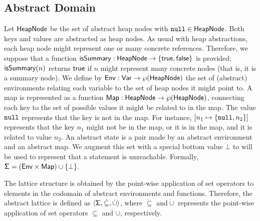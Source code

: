 \subsection{Abstract Domain}
\label{sect:abstractate}

Let $\mathsf{HeapNode}$ be the set of abstract heap nodes with $\mathtt{null} \in \mathsf{HeapNode}$. Both keys and values are abstracted as heap nodes. As usual with heap abstractions, each heap node might represent one or many concrete references. Therefore, we suppose that a function $\mathsf{isSummary} : \mathsf{HeapNode} \to \{\mathsf{true}, \mathsf{false}\}$ is provided; $\mathsf{isSummary}(n)$ returns $\mathsf{true}$ if $n$ might represent many concrete nodes (that is, it is a summary node). We define by $\mathsf{Env} : \mathsf{Var} \to \wp(\mathsf{HeapNode})$ the set of (abstract) environments relating each variable to the set of heap nodes it might point to. A map is represented as a function $\mathsf{Map} : \mathsf{HeapNode} \to \wp(\mathsf{HeapNode})$, connecting each key to the set of possible values it might be related to in the map. The value $\mathtt{null}$ represents that the key is not in the map. For instance, $[n_1 \mapsto \{\mathtt{null}, n_2\}]$ represents that the key $n_1$ might not be in the map, or it is in the map, and it is related to value $n_2$. An abstract state is a pair made by an abstract environment and an abstract map. We augment this set with a special bottom value $\bot$ to will be used to represent that a statement is unreachable. Formally, $\mathsf{\Sigma} = (\mathsf{Env} \times \mathsf{Map}) \cup \{\bot\}$.

The lattice structure is obtained by the point-wise application of set operators to elements in the codomain of abstract environments and functions. Therefore, the abstract lattice is defined as $\langle \mathsf{\Sigma}, \dot{\subseteq}, \dot{\cup} \rangle$, where $\dot{\subseteq}$ and$\dot{\cup}$ represents the point-wise application of set operators $\subseteq$ and $\cup$, respectively.


